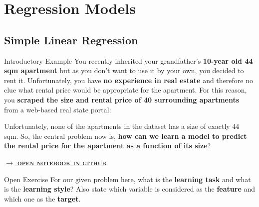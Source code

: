 \documentclass[document.tex]{subfiles}
\begin{document}
    \section{Regression Models}
    
    \subsection{Simple Linear Regression}

    \begin{frame}{Introductory Example}
        You recently inherited your grandfather's \textbf{10-year old 44 sqm apartment} but as you don't want to use it by your own, you decided to rent it. Unfortunately, you have \textbf{no experience in real estate} and therefore no clue what rental price would be appropriate for the apartment. For this reason, you \textbf{scraped the size and rental price of 40 surrounding apartments} from a web-based real state portal:
        
        \begin{table}
            \scalebox{0.8}{}
        \end{table}
        
        Unfortunately, none of the apartments in the dataset has a size of exactly 44 sqm. So, the central problem now is, \textbf{how can we learn a model to predict the rental price for the apartment as a function of its size}?

        \small{\href{https://nbviewer.jupyter.org/github/saschaschworm/big-data-and-data-science/blob/master/notebooks/demos/rental-prices-single-linear-regression.ipynb}{\textsc{\textbf{$\rightarrow$ open notebook in github}}}}
    \end{frame}

    \begin{frame}{Open Exercise }
        For our given problem here, what is the \textbf{learning task} and what is the \textbf{learning style}? Also state which variable is considered as the \textbf{feature} and which one as the \textbf{target}.
        
    \end{frame}
\end{document}
